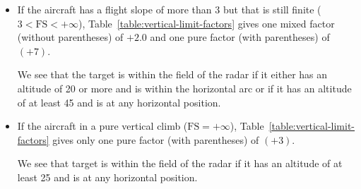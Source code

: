 {\begin{itemize}
\item
If the aircraft has a flight slope of more than 3 but that is still finite ($3 < \mbox{FS} < +\infty$), Table~\ref{table:vertical-limit-factors} gives one mixed factor (without parentheses) of $+2.0$ and one pure factor (with parentheses) of $(+7)$.

We see that the target is within the field of the radar if it either has an altitude of 20 or more and is within the  horizontal arc or if it has an altitude of at least 45 and is at any horizontal position.

\item
If the aircraft in a pure vertical climb ($\mbox{FS} = +\infty$), Table~\ref{table:vertical-limit-factors} gives only one pure factor (with parentheses) of $(+3)$.

We see that target is within the field of the radar if it has an altitude of at least 25 and is at any horizontal position.

\end{itemize}



}

